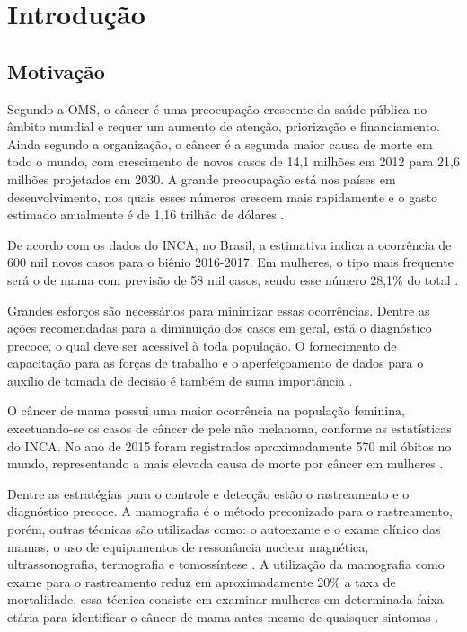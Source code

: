 \chapter[Introdução]{Introdução}\label{Introdução}


\section{Motivação}
Segundo a \ac{OMS}, o câncer é uma preocupação crescente da saúde pública no âmbito mundial e requer um aumento de atenção, priorização e financiamento. Ainda segundo a organização, o câncer é a segunda maior causa de morte em todo o mundo, com crescimento de novos casos de 14,1 milhões em 2012 para 21,6 milhões projetados em 2030. A grande preocupação está nos países em desenvolvimento, nos quais esses números crescem mais rapidamente e o gasto estimado anualmente é de 1,16 trilhão de dólares \cite{oms}.

De acordo com os dados do \ac{INCA}, no Brasil, a estimativa indica a ocorrência de 600 mil novos casos para o biênio 2016-2017. Em mulheres, o tipo mais frequente será o de mama com previsão de 58 mil casos, sendo esse número 28,1\% do total \cite{inca}.

Grandes esforços são necessários para minimizar essas ocorrências. Dentre as ações recomendadas para a diminuição dos casos em geral, está o diagnóstico precoce, o qual deve ser acessível à toda população. O fornecimento de capacitação para as forças de trabalho e o aperfeiçoamento de dados para o auxílio de tomada de decisão é também de suma importância \cite{oms}. 

O câncer de mama possui uma maior ocorrência na população feminina, excetuando-se os casos de câncer de pele não melanoma, conforme as estatísticas do \ac{INCA}. No ano de 2015 foram registrados aproximadamente 570 mil óbitos no mundo, representando a mais elevada causa de morte por câncer em mulheres \cite{oms}. 

Dentre as estratégias para o controle e detecção estão o rastreamento e o diagnóstico precoce. A mamografia é o método preconizado para o rastreamento, porém, outras técnicas são utilizadas como: o autoexame e o exame clínico das mamas, o uso de equipamentos de ressonância nuclear magnética, ultrassonografia, termografia e tomossíntese \cite{inca}. A utilização da mamografia como exame para o rastreamento reduz em aproximadamente 20\% a taxa de mortalidade, essa técnica consiste em examinar mulheres em determinada faixa etária para identificar o câncer de mama antes mesmo de quaisquer sintomas \cite{oms}.

